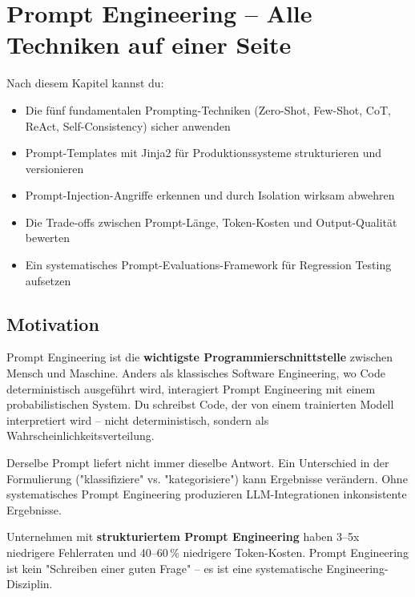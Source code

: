 \chapter{Prompt Engineering -- Alle Techniken auf einer Seite}
\label{chap:prompt_engineering}

\begin{lernziele}
Nach diesem Kapitel kannst du:
\begin{itemize}
    \item Die fünf fundamentalen Prompting-Techniken (Zero-Shot, Few-Shot, CoT, ReAct, Self-Consistency) sicher anwenden
    \item Prompt-Templates mit Jinja2 für Produktionssysteme strukturieren und versionieren
    \item Prompt-Injection-Angriffe erkennen und durch Isolation wirksam abwehren
    \item Die Trade-offs zwischen Prompt-Länge, Token-Kosten und Output-Qualität bewerten
    \item Ein systematisches Prompt-Evaluations-Framework für Regression Testing aufsetzen
\end{itemize}
\end{lernziele}

\section{Motivation}

Prompt Engineering ist die \textbf{wichtigste Programmierschnittstelle} zwischen Mensch und Maschine. Anders als klassisches Software Engineering, wo Code deterministisch ausgeführt wird, interagiert Prompt Engineering mit einem probabilistischen System. Du schreibst Code, der von einem trainierten Modell interpretiert wird -- nicht deterministisch, sondern als Wahrscheinlichkeitsverteilung.

Derselbe Prompt liefert nicht immer dieselbe Antwort. Ein Unterschied in der Formulierung ("klassifiziere" vs. "kategorisiere") kann Ergebnisse verändern. Ohne systematisches Prompt Engineering produzieren LLM-Integrationen inkonsistente Ergebnisse.

Unternehmen mit \textbf{strukturiertem Prompt Engineering} haben 3--5x niedrigere Fehlerraten und 40--60\,\% niedrigere Token-Kosten. Prompt Engineering ist kein "Schreiben einer guten Frage" -- es ist eine systematische Engineering-Disziplin.


